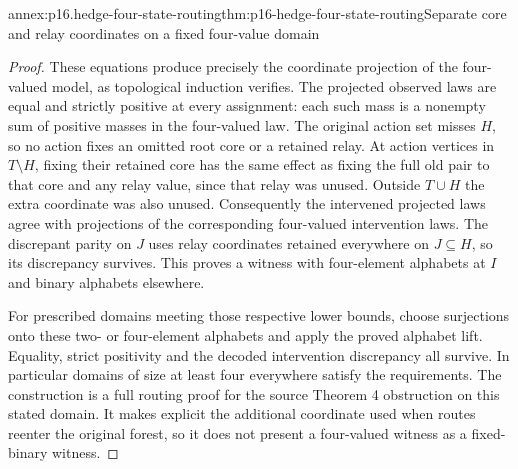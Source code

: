 \begin{annexitem}{annex:p16.hedge-four-state-routing}{thm:p16-hedge-four-state-routing}{Separate core and relay coordinates on a fixed four-value domain}
\begin{proof}
These equations produce precisely the coordinate projection of
the four-valued model, as topological induction verifies. The
projected observed laws are equal and strictly positive at every
assignment: each such mass is a nonempty sum of positive masses
in the four-valued law. The original action set misses \(H\),
so no action fixes an omitted root core or a retained relay. At
action vertices in \(T\setminus H\), fixing their retained
core has the same effect as fixing the full old pair to that core
and any relay value, since that relay was unused. Outside \(T\cup H\)
the extra coordinate was also unused. Consequently the intervened
projected laws agree with projections of the corresponding four-valued
intervention laws. The discrepant parity on \(J\) uses relay
coordinates retained everywhere on \(J\subseteq H\), so its
discrepancy survives. This proves a witness with four-element alphabets
at \(I\) and binary alphabets elsewhere.

For prescribed domains meeting those respective lower bounds, choose
surjections onto these two- or four-element alphabets and apply the
proved alphabet lift. Equality, strict positivity and the decoded
intervention discrepancy all survive. In particular domains of size
at least four everywhere satisfy the requirements.
The construction is a full routing proof for the source Theorem 4
obstruction on this stated domain. It makes explicit the additional
coordinate used when routes reenter the original forest, so it
does not present a four-valued witness as a fixed-binary witness.
\end{proof}
\end{annexitem}

